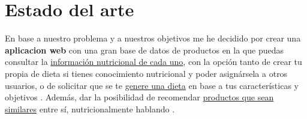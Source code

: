 \chapter{Estado del arte} \label{sec:estado_del_arte}

En base a nuestro problema y a nuestros objetivos me he decidido por crear una \textbf{aplicacion web} con una gran base de datos de productos en la que puedas consultar
la \href{https://github.com/josemip98/TFG/issues/3}{información nutricional de cada uno}, con la opción tanto de crear tu propia de dieta si tienes conocimiento nutricional y poder asignársela a otros usuarios, o de solicitar que 
se te \href{https://github.com/josemip98/TFG/issues/12}{genere una dieta} en base a tus características y objetivos . Además, dar la posibilidad de recomendar \href{https://github.com/josemip98/TFG/issues/10}{productos que sean similares} entre sí, nutricionalmente hablando .

